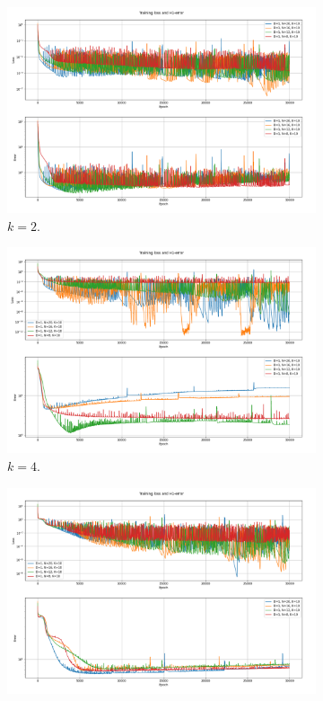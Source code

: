 \begin{figure}[h!]
    \centering
    \begin{subfigure}[b]{0.48\textwidth}
        \includegraphics[width=\textwidth]{img/VPINN-Comparison-k2increaseN.png}
        \caption{$k=2$.}
        \label{fig:vpinnsk2increaseN}
    \end{subfigure}
    \hfill
    \begin{subfigure}[b]{0.48\textwidth}
        \includegraphics[width=\textwidth]{img/VPINN-Comparison-k4increaseN.png}
        \caption{$k=4$.}
        \label{fig:vpinnsk4increaseN}
    \end{subfigure}
    \vfill
    \begin{subfigure}[b]{0.48\textwidth}
        \includegraphics[width=\textwidth]{img/VPINN-Comparison-k6increaseN.png}

\end{subfigure}
\end{figure}
